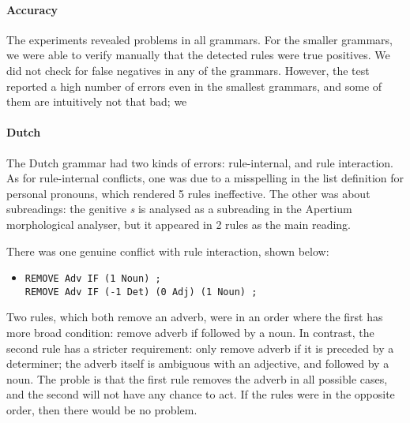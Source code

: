 \paragraph{Accuracy} 
The experiments revealed problems in all grammars. For the smaller
grammars, we were able to verify manually that the detected rules were
true positives.
We did not check for false negatives in any of the grammars. However, the test reported a high number of errors even in the smallest grammars, and some of them are intuitively not that bad; we 


\paragraph{Dutch} The Dutch grammar had two kinds of errors: rule-internal, and rule interaction. As for rule-internal conflicts, one was due to a misspelling in the list definition for personal pronouns, which rendered 5 rules ineffective. The other was about subreadings: the genitive \emph{s} is analysed as a subreading in the Apertium morphological analyser, but it appeared in 2 rules as the main reading. 

There was one genuine conflict with rule interaction, shown below:

\begin{itemize}
\item[] 
\begin{verbatim}REMOVE Adv IF (1 Noun) ;
REMOVE Adv IF (-1 Det) (0 Adj) (1 Noun) ;
\end{verbatim}
\end{itemize}

Two rules, which both remove an adverb, were in an order where the first has more broad condition: remove adverb if followed by a noun. In contrast, the second rule has a stricter requirement: only remove adverb if it is preceded by a determiner; the adverb itself is ambiguous with an adjective, and followed by a noun. The proble is that the first rule removes the adverb in all possible cases, and the second will not have any chance to act. If the rules were in the opposite order, then there would be no problem.



